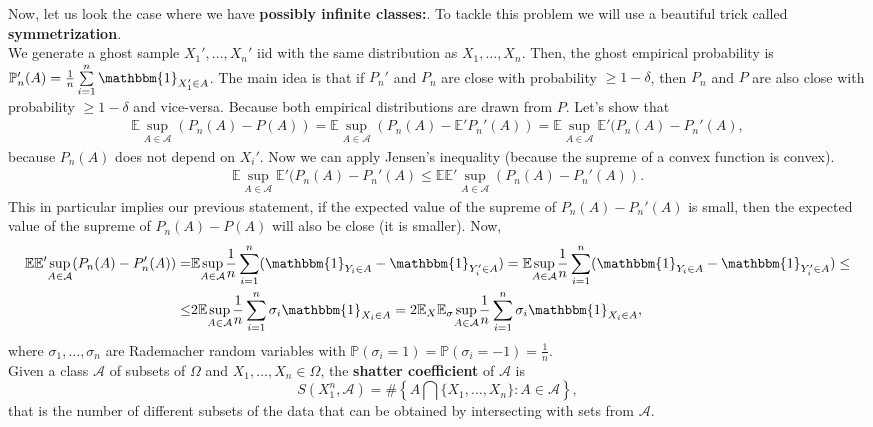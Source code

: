 \documentclass[11pt, english]{article}
\begin{document}
Now, let us look the case where we have \textbf{possibly infinite classes:}. To tackle this problem we will use a beautiful trick called \textbf{symmetrization}.\\
We generate a ghost sample $X_1',\dots,X_n'$ iid with the same distribution as $X_1,\dots,X_n$. Then, the ghost empirical probability is $\mathbb{P}_n'(A)=\frac{1}{n}\sum\limits_{i=1}^n\mathbbm{1}_{X_1'\in A}$. The main idea is that if $P_n'$ and $P_n$ are close with probability $\geq 1-\delta$, then $P_n$ and $P$ are also close with probability $\geq 1-\delta$ and vice-versa. Because both empirical distributions are drawn from $P$. Let's show that
\begin{align}
	\mathbb{E}\underset{A\in\mathcal{A}}{\sup}(P_n(A)-P(A))=\mathbb{E}\underset{A\in\mathcal{A}}{\sup}(P_n(A)-\mathbb{E}'P_n'(A))=\mathbb{E}\underset{A\in\mathcal{A}}{\sup}\mathbb{E}'(P_n(A)-P_n'(A),
\end{align}
because $P_n(A)$ does not depend on $X_i'$. Now we can apply Jensen's inequality (because the supreme of a convex function is convex).
\begin{align}
	\mathbb{E}\underset{A\in\mathcal{A}}{\sup}\mathbb{E}'(P_n(A)-P_n'(A)\leq \mathbb{E}\mathbb{E}'\underset{A\in\mathcal{A}}{\sup}(P_n(A)-P_n'(A)).
\end{align}
 This in particular implies our previous statement, if the expected value of the supreme of $P_n(A)-P_n'(A)$ is small, then the expected value of the supreme of $P_n(A)-P(A)$ will also be close (it is smaller). Now,
 \begin{align}
 	\mathbb{E}\mathbb{E}'\underset{A\in\mathcal{A}}{\sup}(P_n(A)-P_n'(A))=&\mathbb{E}\underset{A\in\mathcal{A}}{\sup}\frac{1}{n}\sum\limits_{i=1}^n(\mathbbm{1}_{Y_i\in A}-\mathbbm{1}_{Y_i'\in A})=\mathbb{E}\underset{A\in\mathcal{A}}{\sup}\frac{1}{n}\sum\limits_{i=1}^n(\mathbbm{1}_{Y_i\in A}-\mathbbm{1}_{Y_i'\in A})\leq\\
 	\leq & 2\mathbb{E}\underset{A\in\mathcal{A}}{\sup}\frac{1}{n}\sum\limits_{i=1}^n\sigma_i\mathbbm{1}_{X_i\in A}=2\mathbb{E}_X\mathbb{E}_{\sigma}\underset{A\in\mathcal{A}}{\sup}\frac{1}{n}\sum\limits_{i=1}^n\sigma_i\mathbbm{1}_{X_i\in A},
 \end{align}
 where $\sigma_1,\dots,\sigma_n$ are Rademacher random variables with $\mathbb{P}(\sigma_i=1)=\mathbb{P}(\sigma_i=-1)=\frac{1}{n}$.\\
 
 Given a class $\mathcal{A}$ of subsets of $\Omega$ and $X_1,\dots,X_n\in \Omega$, the \textbf{shatter coefficient} of $\mathcal{A}$ is 
 \begin{equation}
 	S(X_1^n,\mathcal{A})=\#\left\{A\bigcap\{X_1,\dots,X_n\}:A\in\mathcal{A}\right\},
 \end{equation}
 that is the number of different subsets of the data that can be obtained by intersecting with sets from $\mathcal{A}$.\\
 
\end{document}
